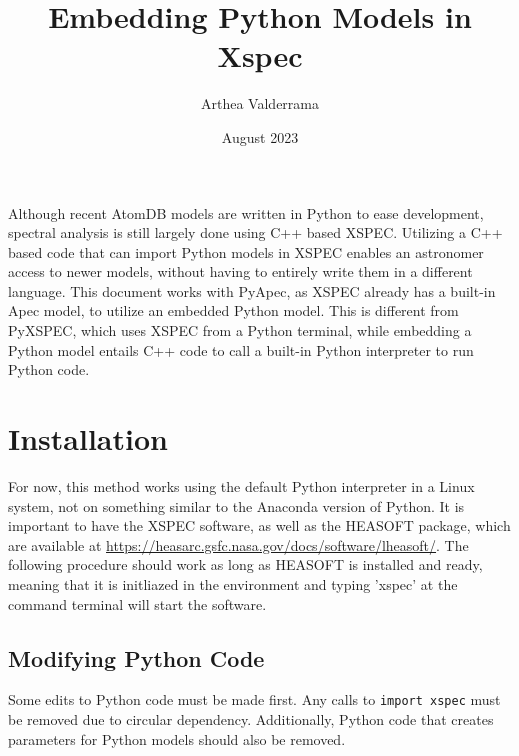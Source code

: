 \documentclass[12pt]{article}
\author{Arthea Valderrama}
\date{August 2023}
\title{Embedding Python Models in Xspec}
\begin{document}
\maketitle

	Although recent AtomDB models are written in Python to ease development, spectral analysis is still largely done using C++ based XSPEC. Utilizing a C++ based code that can import Python models in XSPEC enables an astronomer access to newer models, without having to entirely write them in a different language. This document works with PyApec, as XSPEC already has a built-in Apec model, to utilize an embedded Python model. This is different from PyXSPEC, which uses XSPEC from a Python terminal, while embedding a Python model entails C++ code to call a built-in Python interpreter to run Python code.

\section{Installation} 

For now, this method works using the default Python interpreter in a Linux system, not on something similar to the Anaconda version of Python. It is important to have the XSPEC software, as well as the HEASOFT package, which are available at \url{https://heasarc.gsfc.nasa.gov/docs/software/lheasoft/}. The following procedure should work as long as HEASOFT is installed and ready, meaning that it is initliazed in the environment and typing 'xspec' at the command terminal will start the software.  

\subsection{Modifying Python Code} \label{python}
Some edits to Python code must be made first. Any calls to \texttt{import xspec} must be removed due to circular dependency. Additionally, Python code that creates parameters for Python models should also be removed. 
\end{document}
